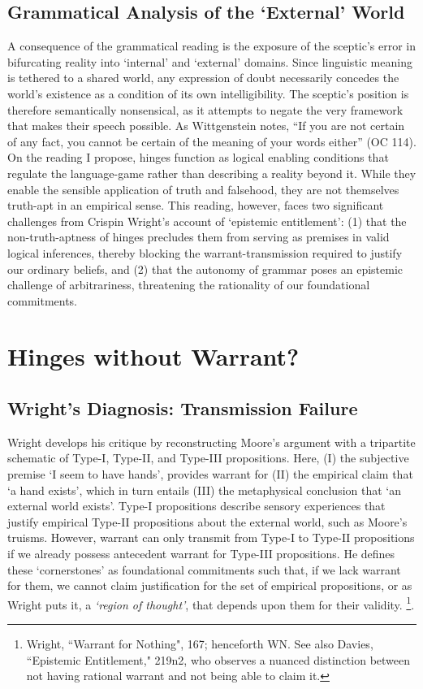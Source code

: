\subsection{Grammatical Analysis of the `External' World}

A consequence of the grammatical reading is the exposure of the
sceptic's error in bifurcating reality into `internal' and `external'
domains. Since linguistic meaning is tethered to a shared world, any
expression of doubt necessarily concedes the world's existence as a
condition of its own intelligibility. The sceptic's position is
therefore semantically nonsensical, as it attempts to negate the very
framework that makes their speech possible. As Wittgenstein notes, ``If
you are not certain of any fact, you cannot be certain of the meaning of
your words either'' (OC 114). On the reading I propose, hinges function
as logical enabling conditions that regulate the language-game rather
than describing a reality beyond it. While they enable the sensible
application of truth and falsehood, they are not themselves truth-apt in
an empirical sense. This reading, however, faces two significant
challenges from Crispin Wright's account of `epistemic entitlement': (1) that the non-truth-aptness of hinges precludes them from serving as
premises in valid logical inferences, thereby blocking the
warrant-transmission required to justify our ordinary beliefs, and (2)
that the autonomy of grammar poses an epistemic challenge of
arbitrariness, threatening the rationality of our foundational
commitments.

\section{Hinges without Warrant?}

\subsection{Wright's Diagnosis: Transmission Failure}

Wright develops his critique by reconstructing Moore's argument with a
tripartite schematic of Type-I, Type-II, and Type-III propositions.
Here, (I) the subjective premise `I seem to have hands', provides
warrant for (II) the empirical claim that `a hand exists', which in turn
entails (III) the metaphysical conclusion that `an external world
exists'. Type-I propositions describe sensory experiences that justify
empirical Type-II propositions about the external world, such as Moore's
truisms. However, warrant can only transmit from Type-I to Type-II
propositions if we already possess antecedent warrant for Type-III
propositions. He defines these `cornerstones' as foundational
commitments such that, if we lack warrant for them, we cannot claim
justification for the set of empirical propositions, or as Wright puts
it, a \emph{`region of thought'}, that depends upon them for their
validity. \footnote{Wright, ``Warrant for Nothing", 167; henceforth WN.
  See also Davies, ``Epistemic Entitlement," 219n2, who observes a
  nuanced distinction between not having rational warrant and not being
  able to claim it.}.

